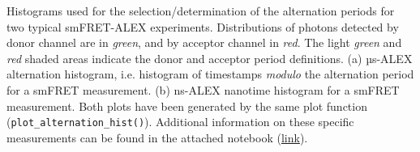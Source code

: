 \label{fig:altern_hist_double} 
Histograms used for the selection/determination of the alternation periods for two typical smFRET-ALEX experiments.
Distributions of photons detected by donor channel are in \textit{green}, and by acceptor channel in \textit{red}.
The light \textit{green} and \textit{red} shaded areas indicate the donor and acceptor period definitions.
(a) µs-ALEX alternation histogram, i.e. histogram of timestamps \textit{modulo} the alternation period for a smFRET measurement. 
(b) ns-ALEX nanotime histogram for a smFRET measurement. 
Both plots have been generated by the same plot function (\texttt{plot\_alternation\_hist()}). 
Additional information on these specific measurements can be found in the attached notebook 
(\href{http://nbviewer.jupyter.org/github/tritemio/fretbursts_paper/blob/master/notebooks/Figures%20-%20ALEX%20histograms.ipynb}{link}).